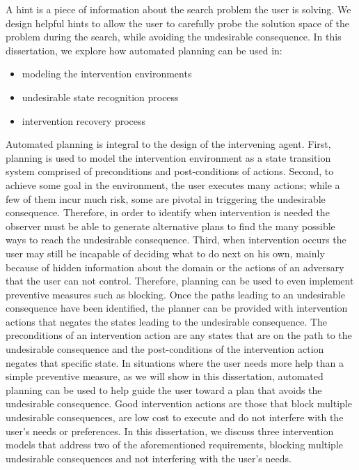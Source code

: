 A hint is a piece of information about the search problem the user is solving. 
We design helpful hints to allow the user to carefully probe the solution space of the problem during the search, while avoiding the undesirable consequence.
In this dissertation, we explore how automated planning can be used in:
\begin{itemize}
\item modeling the intervention environments
\item undesirable state recognition process
\item intervention recovery process
\end{itemize}
Automated planning is integral to the design of the intervening agent. 
First, planning is used to model the intervention environment as a state transition system comprised of preconditions and post-conditions of actions. 
Second, to achieve some goal in the environment, the user executes many actions; while a few of them incur much risk, some are pivotal in triggering the undesirable consequence. 
Therefore, in order to identify when intervention is needed the observer must be able to generate alternative plans to find the many possible ways to reach the undesirable consequence. 
Third, when intervention occurs the user may still be incapable of deciding what to do next on his own, mainly because of hidden information about the domain or the actions of an adversary that the user can not control. 
Therefore, planning can be used to even implement preventive measures such as blocking. 
Once the paths leading to an undesirable consequence have been identified, the planner can be provided with intervention actions that negates the states leading to the undesirable consequence. 
The preconditions of an intervention action are any states that are on the path to the undesirable consequence and the post-conditions of the intervention action negates that specific state. 
In situations where the user needs more help than a simple preventive measure, as we will show in this dissertation, automated planning can be used to help guide the user toward a plan that avoids the undesirable consequence.
Good intervention actions are those that block multiple undesirable consequences, are low cost to execute and do not interfere with the user’s needs or preferences. 
In this dissertation, we discuss three intervention models that address two of the aforementioned requirements, blocking multiple undesirable consequences and not interfering with the user's needs. 
